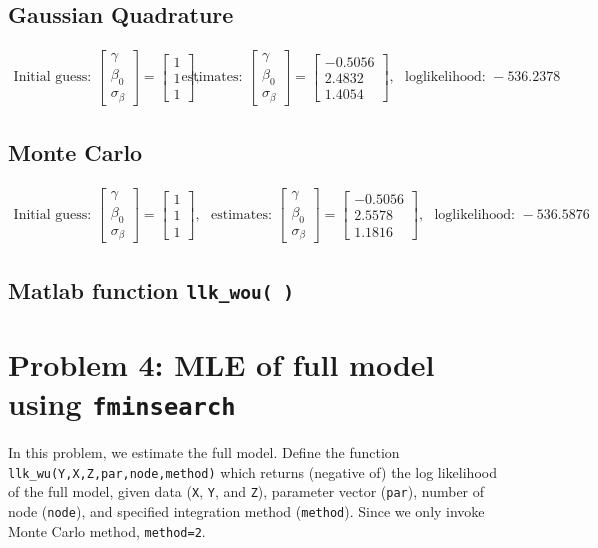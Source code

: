 \documentclass[11pt,letter]{article}
\newcounter{lem}[section] \setcounter{lem}{0}
\newcommand{\bmat}[1]{\begin{bmatrix} #1 \end{bmatrix}}%
\newcommand{\code}[1]{\texttt{#1}}
\begin{document}
\subsection*{Gaussian Quadrature}
\begin{align*}
\text{Initial guess: }\bmat{\gamma \\ \beta_0 \\ \sigma_\beta} = \bmat{1 \\ 1 \\ 1}, \ \ \ 
&\text{estimates: }\bmat{\gamma \\ \beta_0 \\ \sigma_\beta} = \bmat{-0.5056 \\ 2.4832 \\ 1.4054}, \ \ \ 
\text{loglikelihood: }-536.2378 
\end{align*}

\subsection*{Monte Carlo}
\begin{align*}
\text{Initial guess: }\bmat{\gamma \\ \beta_0 \\ \sigma_\beta} = \bmat{1 \\ 1 \\ 1}, \ \ \ 
\text{estimates: }\bmat{\gamma \\ \beta_0 \\ \sigma_\beta} = \bmat{-0.5056 \\ 2.5578 \\ 1.1816}, \ \ \ 
\text{loglikelihood: }-536.5876
\end{align*}


\subsection*{Matlab function \code{llk\_wou( )}}



\section*{Problem 4: MLE of full model using \code{fminsearch}}

In this problem, we estimate the full model. Define the function \code{llk\_wu(Y,X,Z,par,node,method)} which returns (negative of) the log likelihood of the full model, given data (\code{X}, \code{Y}, and \code{Z}), parameter vector (\code{par}), number of node (\code{node}), and specified integration method (\code{method}). Since we only invoke Monte Carlo method, \code{method=2}.  
\end{document}
